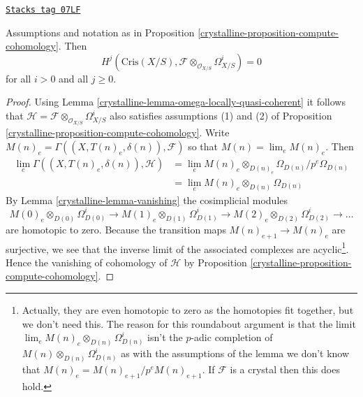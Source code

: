 \begin{lemma}
\label{crystalline-lemma-cohomology-is-zero}
\href{https://stacks.math.columbia.edu/tag/07LF}{\texttt{Stacks tag 07LF}}

Assumptions and notation as in
Proposition \ref{crystalline-proposition-compute-cohomology}.
Then
$$
H^j(\text{Cris}(X/S), \mathcal{F} \otimes_{\mathcal{O}_{X/S}} \Omega^i_{X/S})
= 0
$$
for all $i > 0$ and all $j \geq 0$.
\end{lemma}

\begin{proof}

Using Lemma \ref{crystalline-lemma-omega-locally-quasi-coherent} it follows that
$\mathcal{H} = \mathcal{F} \otimes_{\mathcal{O}_{X/S}} \Omega^i_{X/S}$
also satisfies assumptions (1) and (2) of
Proposition \ref{crystalline-proposition-compute-cohomology}.
Write $M(n)_e = \Gamma((X, T(n)_e, \delta(n)), \mathcal{F})$
so that $M(n) = \lim_e M(n)_e$. Then
\begin{align*}
\lim_e \Gamma((X, T(n)_e, \delta(n)), \mathcal{H}) & =
\lim_e M(n)_e \otimes_{D(n)_e} \Omega_{D(n)}/p^e\Omega_{D(n)} \\
& = \lim_e M(n)_e \otimes_{D(n)} \Omega_{D(n)}
\end{align*}
By
Lemma \ref{crystalline-lemma-vanishing}
the cosimplicial modules
$$
M(0)_e \otimes_{D(0)} \Omega^i_{D(0)} \to
M(1)_e \otimes_{D(1)} \Omega^i_{D(1)} \to
M(2)_e \otimes_{D(2)} \Omega^i_{D(2)} \to \ldots
$$
are homotopic to zero. Because the transition maps
$M(n)_{e + 1} \to M(n)_e$ are surjective, we see that
the inverse limit of the associated complexes are acyclic\footnote{Actually,
they are even homotopic to zero as the homotopies fit together, but we don't
need this. The reason for this roundabout argument is that
the limit $\lim_e M(n)_e \otimes_{D(n)} \Omega^i_{D(n)}$ isn't the
$p$-adic completion of $M(n) \otimes_{D(n)} \Omega^i_{D(n)}$ as with
the assumptions of the lemma we don't know that
$M(n)_e = M(n)_{e + 1}/p^eM(n)_{e + 1}$. If $\mathcal{F}$ is a crystal
then this does hold.}.
Hence the vanishing of cohomology of $\mathcal{H}$ by
Proposition \ref{crystalline-proposition-compute-cohomology}.
\end{proof}

